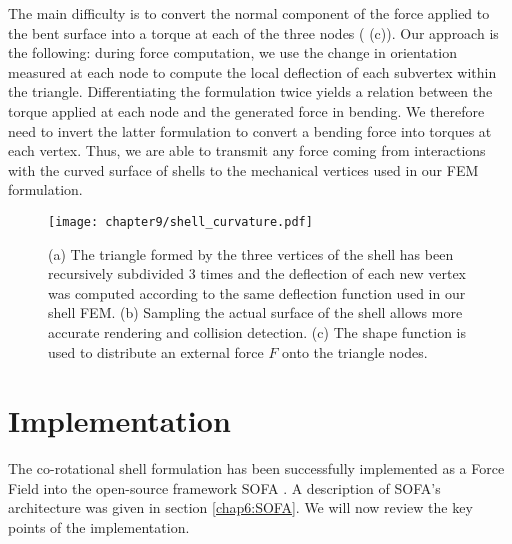 The main difficulty is to convert the normal component of the force applied to the bent surface into a torque at each of the three nodes ( (c)). Our approach is the following: during force computation, we use the change in orientation measured at each node to compute the local deflection of each subvertex within the triangle. Differentiating the formulation twice yields a relation between the torque applied at each node and the generated force in bending. We therefore need to invert the latter formulation to convert a bending force into torques at each vertex. Thus, we are able to transmit any force coming from interactions with the curved surface of shells to the mechanical vertices used in our FEM formulation. 
%
\begin{figure}
\centering
\texttt{[image: chapter9/shell\_curvature.pdf]}
\caption {(a)  The triangle formed by the three vertices of the shell has been recursively subdivided 3 times and the deflection of each new vertex was computed according to the same deflection function used in our shell FEM. (b) Sampling the actual surface of the shell allows more accurate rendering and collision detection. (c) The shape function is used to distribute an external force $F$ onto the triangle nodes.}
\label{chap9:fig-shell}
\end{figure}


\section{Implementation}

The co-rotational shell formulation has been successfully implemented as a Force Field into the open-source framework SOFA \citep{Allard07}. A description of SOFA's architecture was given in section \ref{chap6:SOFA}. We will now review the key points of the implementation.


